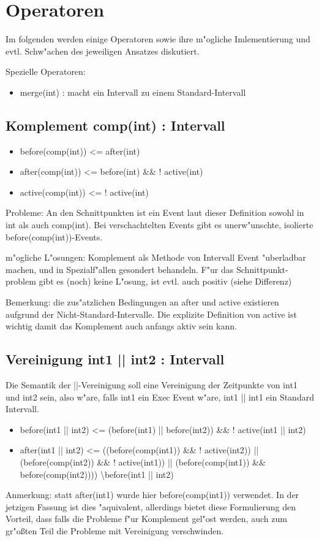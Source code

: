 \documentclass[article,colorback,accentcolor=tud4c]{tudreport}
\begin{document}
\section{Operatoren}
Im folgenden werden einige Operatoren sowie ihre m"ogliche Imlementierung und evtl. Schw"achen des jeweiligen Ansatzes diskutiert.

Spezielle Operatoren:
\begin{itemize}
\item merge(int) : macht ein Intervall zu einem Standard-Intervall
\end{itemize}

\subsection{Komplement comp(int) : Intervall}
\begin{itemize}
\item before(comp(int)) <= after(int)
\item after(comp(int)) <= before(int) \&\& ! active(int)
\item active(comp(int)) <= ! active(int)
\end{itemize}
Probleme: An den Schnittpunkten ist ein Event laut dieser Definition sowohl in int als auch comp(int). Bei verschachtelten Events gibt es unerw"unschte, isolierte before(comp(int))-Events.

m"ogliche L"osungen: Komplement als Methode von Intervall Event "uberladbar machen, und in Spezialf"allen gesondert behandeln. F"ur das Schnittpunkt-problem gibt es (noch) keine L"osung, ist evtl. auch positiv (siehe Differenz)

Bemerkung: die zus"atzlichen Bedingungen an after und active existieren aufgrund der Nicht-Standard-Intervalle. Die explizite Definition von active ist wichtig damit das Komplement auch anfangs aktiv sein kann.

\subsection{Vereinigung int1 || int2 : Intervall}
Die Semantik der ||-Vereinigung soll eine Vereinigung der Zeitpunkte von int1 und int2 sein, also w"are, falls int1 ein Exec Event w"are, int1 || int1 ein Standard Intervall.
\begin{itemize}
\item before(int1 || int2)  <= (before(int1) || before(int2)) \&\& ! active(int1 || int2)
\item after(int1 || int2) <= ((before(comp(int1)) \&\& ! active(int2)) || (before(comp(int2)) \&\& ! active(int1)) || (before(comp(int1)) \&\& before(comp(int2)))) \textbackslash before(int1 || int2)
\end{itemize}
Anmerkung: statt after(int1) wurde hier before(comp(int1)) verwendet. In der jetzigen Fassung ist dies "aquivalent, allerdings bietet diese Formulierung den Vorteil, dass falls die Probleme f"ur Komplement gel"ost werden, auch zum gr"o\ss ten Teil die Probleme mit Vereinigung verschwinden.
\end{document}
